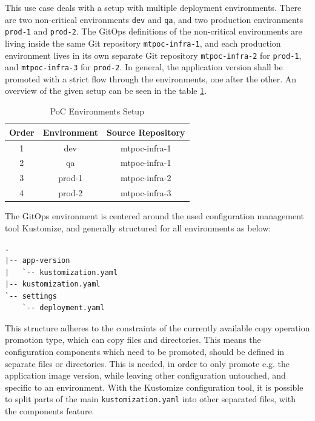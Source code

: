 This use case deals with a setup with multiple deployment environments.
There are two non-critical environments \lstinline|dev| and \lstinline|qa|,
and two production environments \lstinline|prod-1| and \lstinline|prod-2|.
The GitOps definitions of the non-critical environments are living inside the same
Git repository \lstinline|mtpoc-infra-1|,
and each production environment lives in its own separate Git repository
\lstinline|mtpoc-infra-2| for \lstinline|prod-1|,
and \lstinline|mtpoc-infra-3| for \lstinline|prod-2|.
In general, the application version shall be promoted with a strict flow
through the environments, one after the other.
An overview of the given setup can be seen in the table \ref{table:poc-environments-setup}.

\begin{table}[h]
\begin{center}
	\begin{tabular}{||c c c||} 
		\hline
		Order & Environment & Source Repository \\ [0.5ex] 
		\hline\hline
		1 & dev & mtpoc-infra-1 \\ 
		\hline
		2 & qa & mtpoc-infra-1 \\
		\hline
		3 & prod-1 & mtpoc-infra-2 \\
		\hline
		4 & prod-2 & mtpoc-infra-3 \\ [1ex]
		\hline
	\end{tabular}
	\caption{PoC Environments Setup}
	\label{table:poc-environments-setup}
\end{center}
\end{table}

The GitOps environment is centered around the used configuration management tool
Kustomize, and generally structured for all environments as below:

\begin{lstlisting}
.
|-- app-version
|   `-- kustomization.yaml
|-- kustomization.yaml
`-- settings
    `-- deployment.yaml
\end{lstlisting}

This structure adheres to the constraints of the currently available
copy operation promotion type, which can copy files and directories.
This means the configuration components which need to be promoted,
should be defined in separate files or directories.
This is needed, in order to only promote e.g. the application image version,
while leaving other configuration untouched, and specific to an environment.
With the Kustomize configuration tool, it is possible to split
parts of the main \lstinline|kustomization.yaml| into other separated files,
with the components feature.

